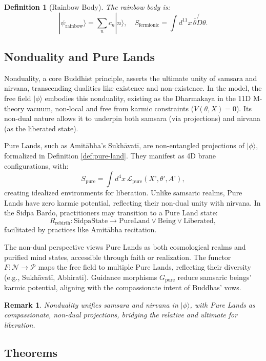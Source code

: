 \documentclass{article}
\newtheorem{definition}{Definition}
\newtheorem{remark}{Remark}
\begin{document}
\begin{definition}[Rainbow Body]
\label{def:rainbow-body}
The rainbow body is:
\[
|\psi_{\text{rainbow}}\rangle = \sum_n c_n |n\rangle, \quad S_{\text{fermionic}} = \int d^{11}x \, \bar{\theta} \not{D} \theta.
\]
\end{definition}

\subsection{Nonduality and Pure Lands}
\label{subsec:nonduality-pure-lands}
Nonduality, a core Buddhist principle, asserts the ultimate unity of samsara and nirvana, transcending dualities like existence and non-existence. In the model, the free field \( |\phi\rangle \) embodies this nonduality, existing as the Dharmakaya in the 11D M-theory vacuum, non-local and free from karmic constraints (\( V(\theta, X) = 0 \)). Its non-dual nature allows it to underpin both samsara (via projections) and nirvana (as the liberated state).

Pure Lands, such as Amitābha’s Sukhāvatī, are non-entangled projections of \( |\phi\rangle \), formalized in Definition \ref{def:pure-land}. They manifest as 4D brane configurations, with:
\[
S_{\text{pure}} = \int d^4x \, \mathcal{L}_{\text{pure}}(X’, \theta’, A’),
\]
creating idealized environments for liberation. Unlike samsaric realms, Pure Lands have zero karmic potential, reflecting their non-dual unity with nirvana. In the Sidpa Bardo, practitioners may transition to a Pure Land state:
\[
R_{\text{rebirth}} : \text{SidpaState} \to \text{PureLand} \lor \text{Being} \lor \text{Liberated},
\]
facilitated by practices like Amitābha recitation.

The non-dual perspective views Pure Lands as both cosmological realms and purified mind states, accessible through faith or realization. The functor \( F: \mathcal{N} \to \mathcal{P} \) maps the free field to multiple Pure Lands, reflecting their diversity (e.g., Sukhāvatī, Abhirati). Guidance morphisms \( G_{\text{pure}} \) reduce samsaric beings’ karmic potential, aligning with the compassionate intent of Buddhas’ vows.

\begin{remark}
Nonduality unifies samsara and nirvana in \( |\phi\rangle \), with Pure Lands as compassionate, non-dual projections, bridging the relative and ultimate for liberation.
\end{remark}

\subsection{Theorems}
\label{sec:theorems}
\end{document}
